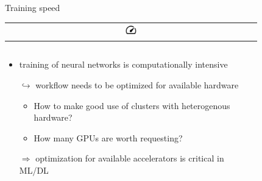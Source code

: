 \documentclass[compress,aspectratio=169]{beamer}
\begin{document}
\begin{frame}{Training speed 
              \begin{tabular}{@{}c@{}}
                  \includegraphics[width=0.05\textwidth]{assets/speed_FILL0_wght400_GRAD0_opsz48.png}
              \end{tabular}
              }

    \vspace{-3em}

    \begin{columns}
        \begin{column}{0.6\textwidth}
            \begin{itemize}
                \item training of neural networks is computationally intensive
                \item[$\hookrightarrow$] workflow needs to be optimized for available hardware
                    \begin{itemize}
                        \item How to make good use of clusters with heterogenous hardware?
                        \item How many GPUs are worth requesting?
                    \end{itemize}
                    \vspace{2em}
                \item[$\Rightarrow$] optimization for available accelerators is critical in ML/DL
            \end{itemize}
        \end{column}
        \begin{column}{0.4\textwidth}
            \vspace{-1em}
            \begin{figure}

\end{figure}
\end{column}
\end{columns}
\end{frame}
\end{document}
